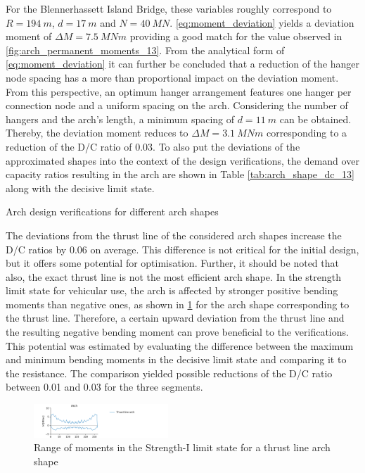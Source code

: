For the Blennerhassett Island Bridge, these variables roughly correspond to $R=\SI{194}{m}$, $d=\SI{17}{m}$ and $N=\SI{40}{MN}$. \cref{eq:moment_deviation} yields a deviation moment of $\Delta M=\SI{7.5}{MNm}$ providing a good match for the value observed in \cref{fig:arch_permanent_moments_13}. From the analytical form of \cref{eq:moment_deviation} it can further be concluded that a reduction of the hanger node spacing has a more than proportional impact on the deviation moment. From this perspective, an optimum hanger arrangement features one hanger per connection node and a uniform spacing on the arch. Considering the number of hangers and the arch's length, a minimum spacing of $d=\SI{11}{m}$ can be obtained. Thereby, the deviation moment reduces to $\Delta M=\SI{3.1}{MNm}$ corresponding to a reduction of the D/C ratio of 0.03.
To also put the deviations of the approximated shapes into the context of the design verifications, the demand over capacity ratios resulting in the arch are shown in Table \ref{tab:arch_shape_dc_13} along with the decisive limit state.

\begin{table}[H]
    \centering
    \caption{Arch design verifications for different arch shapes}
    \label{tab:arch_shape_dc_13}
    
\end{table}

The deviations from the thrust line of the considered arch shapes increase the D/C ratios by 0.06 on average. This difference is not critical for the initial design, but it offers some potential for optimisation. Further, it should be noted that also, the exact thrust line is not the most efficient arch shape. In the strength limit state for vehicular use, the arch is affected by stronger positive bending moments than negative ones, as shown in \cref{fig:arch_shape_strength_1} for the arch shape corresponding to the thrust line. Therefore, a certain upward deviation from the thrust line and the resulting negative bending moment can prove beneficial to the verifications. This potential was estimated by evaluating the difference between the maximum and minimum bending moments in the decisive limit state and comparing it to the resistance. The comparison yielded possible reductions of the D/C ratio between 0.01 and 0.03 for the three segments.

\begin{figure}[H]
    \centering
    \includegraphics[trim={1cm 0 10cm 0.48cm},clip, width=0.45\textwidth]{calculations/arch shape/strength-I_13.png}
    \caption{Range of moments in the Strength-I limit state for a thrust line arch shape}
    \label{fig:arch_shape_strength_1}
\end{figure}


